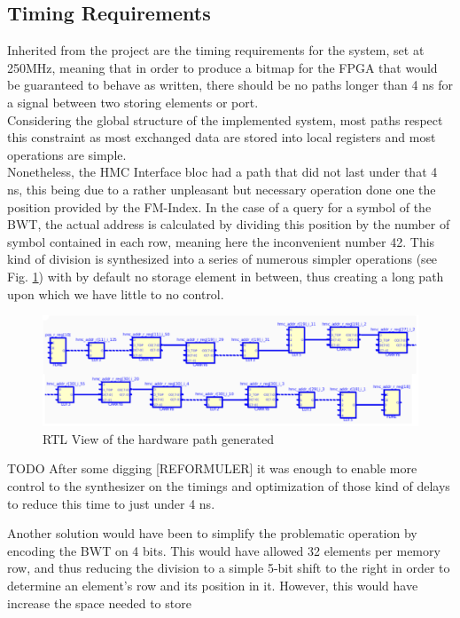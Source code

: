 \subsection{Timing Requirements}

Inherited from the project are the timing requirements for the system, set at 250MHz, meaning that in order to produce a bitmap for the FPGA that would be guaranteed to behave as written, there should be no paths longer than 4 ns for a signal between two storing elements or port. \\
Considering the global structure of the implemented system, most paths respect this constraint as most exchanged data are stored into local registers and most operations are simple.\\

Nonetheless, the HMC Interface bloc had a path that did not last under that 4 ns, this being due to a rather unpleasant but necessary operation done one the position provided by the FM-Index. In the case of a query for a symbol of the BWT, the actual address is calculated by dividing this position by the number of symbol contained in each row, meaning here the inconvenient number 42. This kind of division is synthesized into a series of numerous simpler operations (see Fig. \ref{fig:timing}) with by default no storage element in between, thus creating a long path upon which we have little to no control. \\

\begin{figure}[H]
    \centering
    \hspace*{-3mm}\includegraphics[scale = 0.4]{Figures/TIMING_RTL.png}
    \caption{RTL View of the hardware path generated}
    \label{fig:timing}
\end{figure}
TODO
After some digging [REFORMULER] it was enough to enable more control to the synthesizer on the timings and optimization of those kind of delays to reduce this time to just under 4 ns. 

Another solution would have been to simplify the problematic operation by encoding the BWT on 4 bits. This would have allowed 32 elements per memory row, and thus reducing the division to a simple 5-bit shift to the right in order to determine an element's row and its position in it. However, this would have increase the space needed to store 

